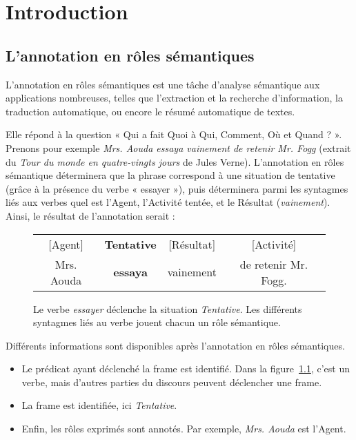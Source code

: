 \chapter{Introduction}
\label{ch:intro}

\section{L'annotation en rôles sémantiques}

L'annotation en rôles sémantiques est une tâche d'analyse sémantique aux
applications nombreuses, telles que l'extraction et la recherche d'information,
la traduction automatique, ou encore le résumé automatique de textes.

Elle répond à la question « Qui a fait Quoi à Qui, Comment, Où et Quand ? ».
Prenons pour exemple \emph{Mrs. Aouda essaya vainement de retenir Mr. Fogg}
(extrait du \emph{Tour du monde en quatre-vingts jours} de Jules Verne).
L'annotation en rôles sémantique déterminera que la phrase correspond à une
situation de tentative (grâce à la présence du verbe « essayer »), puis
déterminera parmi les syntagmes liés aux verbes quel est l'Agent, l'Activité
tentée, et le Résultat (\emph{vainement}). Ainsi, le résultat de l'annotation
serait :

\begin{figure}[ht]
    \centering
    \begin{tabular}{cccc}
    [Agent]  & \textbf{Tentative} & [Résultat]  & [Activité]         \tabularnewline
    Mrs. Aouda & \textbf{essaya}  & vainement & de retenir Mr. Fogg. \tabularnewline
    \end{tabular}
    \caption{\label{fig:introsrl}Le verbe \emph{essayer} déclenche la situation \emph{Tentative}.
    Les différents syntagmes liés au verbe jouent chacun un rôle sémantique.}
\end{figure}


Différents informations sont disponibles après l'annotation en rôles sémantiques.

\begin{itemize}
    \item Le prédicat ayant déclenché la frame est identifié. Dans la
        figure~\ref{fig:introsrl}, c'est un verbe, mais d'autres parties du
        discours peuvent déclencher une frame.
    \item La frame est identifiée, ici \emph{Tentative}.
    \item Enfin, les rôles exprimés sont annotés. Par exemple, \emph{Mrs.
        Aouda} est l'Agent.
\end{itemize}

